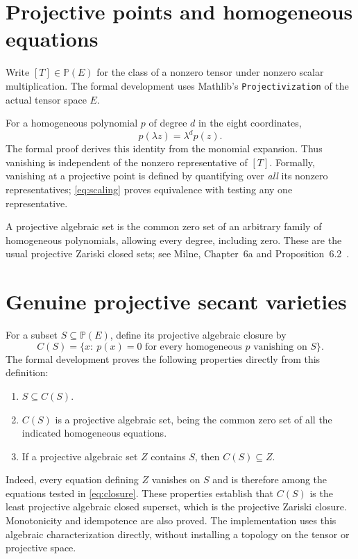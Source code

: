 \documentclass[11pt,a4paper]{article}
\newcommand{\PP}{\mathbb P}
\newcommand{\code}[1]{\nolinkurl{#1}}
\begin{document}
\section{Projective points and homogeneous equations}
Write $[T]\in\PP(E)$ for the class of a nonzero tensor under nonzero scalar multiplication. The formal development uses Mathlib's \code{Projectivization} of the actual tensor space $E$.

For a homogeneous polynomial $p$ of degree $d$ in the eight coordinates,
\begin{equation}\label{eq:scaling}
p(\lambda z)=\lambda^d p(z).
\end{equation}
The formal proof derives this identity from the monomial expansion. Thus vanishing is independent of the nonzero representative of $[T]$. Formally, vanishing at a projective point is defined by quantifying over \emph{all} its nonzero representatives; \eqref{eq:scaling} proves equivalence with testing any one representative.

A projective algebraic set is the common zero set of an arbitrary family of homogeneous polynomials, allowing every degree, including zero. These are the usual projective Zariski closed sets; see Milne, Chapter~6a and Proposition~6.2~\cite{milne}.

\newpage
\section{Genuine projective secant varieties}
For a subset $S\subseteq\PP(E)$, define its projective algebraic closure by
\begin{equation}\label{eq:closure}
C(S)=\bigl\{x:\ p(x)=0\text{ for every homogeneous }p
\text{ vanishing on }S\bigr\}.
\end{equation}
The formal development proves the following properties directly from this definition:
\begin{enumerate}
\item $S\subseteq C(S)$.
\item $C(S)$ is a projective algebraic set, being the common zero set of all the indicated homogeneous equations.
\item If a projective algebraic set $Z$ contains $S$, then $C(S)\subseteq Z$.
\end{enumerate}
Indeed, every equation defining $Z$ vanishes on $S$ and is therefore among the equations tested in \eqref{eq:closure}. These properties establish that $C(S)$ is the least projective algebraic closed superset, which is the projective Zariski closure. Monotonicity and idempotence are also proved. The implementation uses this algebraic characterization directly, without installing a topology on the tensor or projective space.
\end{document}
